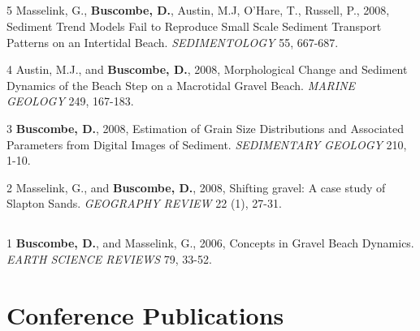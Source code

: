 \documentclass[margin,line]{resume}
\begin{document}
\begin{resume}
\begin{footnotesize}
	\subsection{}
	\begin{list1}
	\item[5] Masselink, G., {\bf Buscombe, D.}, Austin, M.J, O'Hare, T., Russell, P., 2008, Sediment Trend Models Fail to Reproduce Small Scale Sediment Transport Patterns on an Intertidal Beach. {\sl SEDIMENTOLOGY} 55, 667-687.\\
	
	\item[4] Austin, M.J., and {\bf Buscombe, D.}, 2008, Morphological Change and Sediment Dynamics of the Beach Step on a Macrotidal Gravel Beach. {\sl MARINE GEOLOGY} 249, 167-183. \\
	
	\item[3] {\bf Buscombe, D.}, 2008, Estimation of Grain Size Distributions and Associated Parameters from Digital Images of Sediment. {\sl SEDIMENTARY GEOLOGY}  210, 1-10.\\

	\item[2] Masselink, G., and {\bf Buscombe, D.}, 2008, Shifting gravel: A case study of Slapton Sands. {\sl GEOGRAPHY REVIEW} 22 (1), 27-31.
	\end{list1}

	\subsection{}
	\begin{list1}
	\item[1] {\bf Buscombe, D.}, and Masselink, G., 2006, Concepts in Gravel Beach Dynamics. {\sl EARTH SCIENCE REVIEWS} 79, 33-52.
	\end{list1}

        \end{footnotesize}

    \section{\mysidestyle Conference Publications}

        \begin{footnotesize}

	\subsection{}
	\begin{list1}


\end{list1}
\end{footnotesize}
\end{resume}
\end{document}
